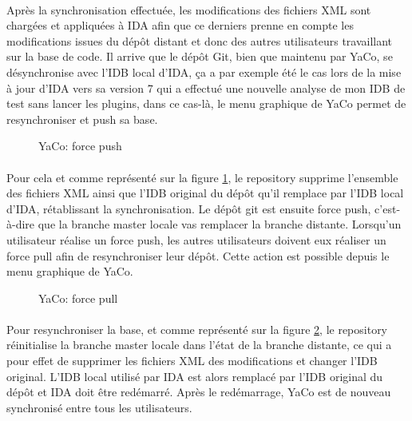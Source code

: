 \documentclass[11pt, book, english, french, standardlists]{upmethodology-document}
\begin{document}
				\paragraph*{}
					Après la synchronisation effectuée, les modifications des fichiers \gls{XML} sont chargées et appliquées à IDA afin que ce derniers prenne en compte les modifications issues du dépôt distant et donc des autres utilisateurs travaillant sur la base de code.
					Il arrive que le dépôt Git, bien que maintenu par YaCo, se désynchronise avec l'\gls{IDB} local d'IDA, ça a par exemple été le cas lors de la mise à jour d'IDA vers sa version 7 qui a effectué une nouvelle analyse de mon \gls{IDB} de test sans lancer les plugins, dans ce cas-là, le menu graphique de YaCo permet de resynchroniser et push sa base.
				\begin{figure}[H]
					\centering%
					\caption{YaCo: force push}%
					\label{fig:YaCo_repository_sync_and_push}%
				\end{figure}
				\paragraph*{}
					Pour cela et comme représenté sur la figure \ref{fig:YaCo_repository_sync_and_push}, le repository supprime l'ensemble des fichiers \gls{XML} ainsi que l'\gls{IDB} original du dépôt qu'il remplace par l'\gls{IDB} local d'IDA, rétablissant la synchronisation. Le dépôt git est ensuite force push, c'est-à-dire que la branche master locale vas remplacer la branche distante.
					Lorsqu'un utilisateur réalise un force push, les autres utilisateurs doivent eux réaliser un force pull afin de resynchroniser leur dépôt. Cette action est possible depuis le menu graphique de YaCo.
				\begin{figure}[H]
					\centering%
					\caption{YaCo: force pull}%
					\label{fig:YaCo_repository_discard_and_pull}%
				\end{figure}
				\paragraph*{}
					Pour resynchroniser la base, et comme représenté sur la figure \ref{fig:YaCo_repository_discard_and_pull}, le repository réinitialise la branche master locale dans l'état de la branche distante, ce qui a pour effet de supprimer les fichiers \gls{XML} des modifications et changer l'\gls{IDB} original. L'\gls{IDB} local utilisé par IDA est alors remplacé par l'\gls{IDB} original du dépôt et IDA doit être redémarré. Après le redémarrage, YaCo est de nouveau synchronisé entre tous les utilisateurs.
	\nocite{*}
	
	
	\printglossary[type=\acronymtype,title=Lexique,toctitle=Lexique]{}
		\setcounter{section}{0}
		\renewcommand{\thesection}{\Alph{section}}
		\renewcommand{\theHsection}{appendixsection.\Alph{section}}
\end{document}
